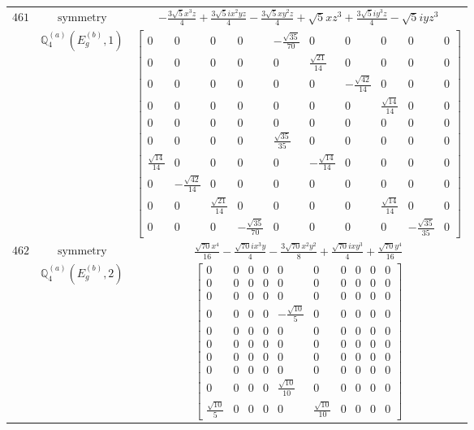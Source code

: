 \documentclass[fleqn,8pt,landscape]{jsarticle}
\begin{document}
\begin{longtable}{ccc}
$ 461 $ & $ \text{symmetry} $ & $ - \frac{3 \sqrt{5} x^{3} z}{4} + \frac{3 \sqrt{5} i x^{2} y z}{4} - \frac{3 \sqrt{5} x y^{2} z}{4} + \sqrt{5} x z^{3} + \frac{3 \sqrt{5} i y^{3} z}{4} - \sqrt{5} i y z^{3} $ \\
$  $ & $ \mathbb{Q}_{4}^{(a)}(E_{g}^{(b)},1) $ & $ \begin{bmatrix} 0 & 0 & 0 & 0 & - \frac{\sqrt{35}}{70} & 0 & 0 & 0 & 0 & 0 \\ 0 & 0 & 0 & 0 & 0 & \frac{\sqrt{21}}{14} & 0 & 0 & 0 & 0 \\ 0 & 0 & 0 & 0 & 0 & 0 & - \frac{\sqrt{42}}{14} & 0 & 0 & 0 \\ 0 & 0 & 0 & 0 & 0 & 0 & 0 & \frac{\sqrt{14}}{14} & 0 & 0 \\ 0 & 0 & 0 & 0 & 0 & 0 & 0 & 0 & 0 & 0 \\ 0 & 0 & 0 & 0 & \frac{\sqrt{35}}{35} & 0 & 0 & 0 & 0 & 0 \\ \frac{\sqrt{14}}{14} & 0 & 0 & 0 & 0 & - \frac{\sqrt{14}}{14} & 0 & 0 & 0 & 0 \\ 0 & - \frac{\sqrt{42}}{14} & 0 & 0 & 0 & 0 & 0 & 0 & 0 & 0 \\ 0 & 0 & \frac{\sqrt{21}}{14} & 0 & 0 & 0 & 0 & \frac{\sqrt{14}}{14} & 0 & 0 \\ 0 & 0 & 0 & - \frac{\sqrt{35}}{70} & 0 & 0 & 0 & 0 & - \frac{\sqrt{35}}{35} & 0 \end{bmatrix} $ \\ \hline
$ 462 $ & $ \text{symmetry} $ & $ \frac{\sqrt{70} x^{4}}{16} - \frac{\sqrt{70} i x^{3} y}{4} - \frac{3 \sqrt{70} x^{2} y^{2}}{8} + \frac{\sqrt{70} i x y^{3}}{4} + \frac{\sqrt{70} y^{4}}{16} $ \\
$  $ & $ \mathbb{Q}_{4}^{(a)}(E_{g}^{(b)},2) $ & $ \begin{bmatrix} 0 & 0 & 0 & 0 & 0 & 0 & 0 & 0 & 0 & 0 \\ 0 & 0 & 0 & 0 & 0 & 0 & 0 & 0 & 0 & 0 \\ 0 & 0 & 0 & 0 & 0 & 0 & 0 & 0 & 0 & 0 \\ 0 & 0 & 0 & 0 & - \frac{\sqrt{10}}{5} & 0 & 0 & 0 & 0 & 0 \\ 0 & 0 & 0 & 0 & 0 & 0 & 0 & 0 & 0 & 0 \\ 0 & 0 & 0 & 0 & 0 & 0 & 0 & 0 & 0 & 0 \\ 0 & 0 & 0 & 0 & 0 & 0 & 0 & 0 & 0 & 0 \\ 0 & 0 & 0 & 0 & 0 & 0 & 0 & 0 & 0 & 0 \\ 0 & 0 & 0 & 0 & \frac{\sqrt{10}}{10} & 0 & 0 & 0 & 0 & 0 \\ \frac{\sqrt{10}}{5} & 0 & 0 & 0 & 0 & \frac{\sqrt{10}}{10} & 0 & 0 & 0 & 0 \end{bmatrix} $ \\ \hline

\end{longtable}
\end{document}

